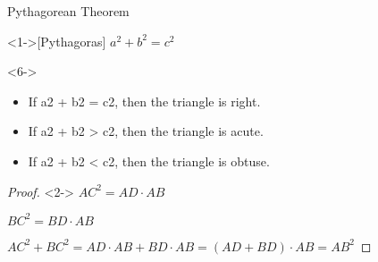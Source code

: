 \documentclass{beamer}
\begin{document}
  
\begin{frame}{Pythagorean Theorem}

\begin{theorem}<1->[Pythagoras] 
$ a^2 + b^2 = c^2$
\end{theorem}

\begin{corollary}<6->
  \begin{itemize}
    \item<7-> If a2 + b2 = c2, then the triangle is right.
    \item<8-> If a2 + b2 > c2, then the triangle is acute.
    \item<9-> If a2 + b2 < c2, then the triangle is obtuse.
  \end{itemize}
\end{corollary}

\begin{proof}<2->
  $AC^2=AD \cdot AB$

  $BC^2=BD \cdot AB$

  $AC^2+BC^2=AD \cdot AB+BD \cdot AB=(AD+BD) \cdot AB = AB^2$
\end{proof}

\end{frame}
\end{document}
